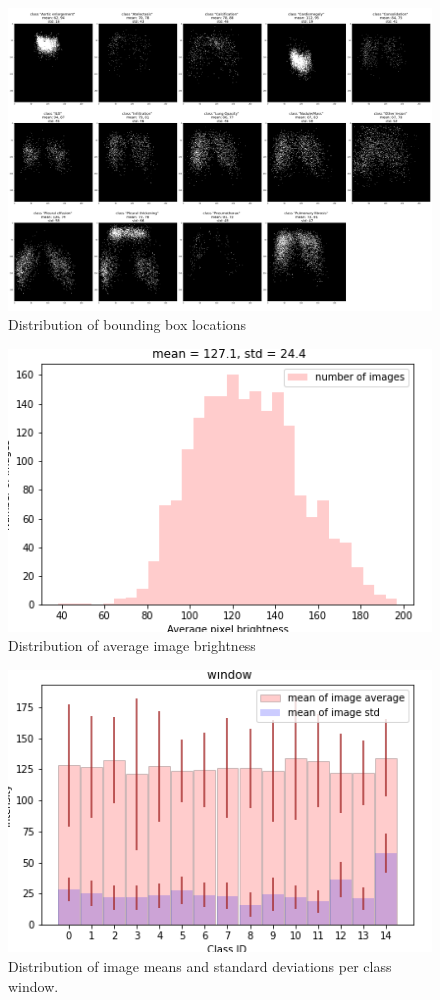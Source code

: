 \documentclass[conference]{IEEEtran}
\begin{document}
\begin{figure}[h]
	\centering
    \includegraphics[width=0.80\linewidth]{bounding_box_distr-5}
    \caption{Distribution of bounding box locations}
	\label{fig:distBB}
\end{figure}

\begin{figure}[h]
	\centering
    \includegraphics[width=0.80\linewidth]{DistAvgBrightness}
    \caption{Distribution of average image brightness}
	\label{fig:distImgBrightness}
\end{figure}

\begin{figure}[h]
	\centering
    \includegraphics[width=0.80\linewidth]{Distribution_of_image_averages_and_standard_deviations_per_class}
    \caption{Distribution of image means and standard deviations per class window.}
	\label{fig:distImgAvgAndStd}
\end{figure}
\end{document}
